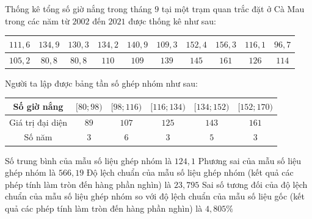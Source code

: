 \begin{ex}%

	Thống kê tổng số giờ nắng trong tháng $9$ tại một trạm quan trắc đặt ở Cà Mau trong các năm từ $2002$ đến $2021$ được thống kê như sau:
	\begin{center}
		\begin{tabular}{|c|c|c|c|c|c|c|c|c|c|}
			\hline $111{,}6$&$134{,}9$&$130{,}3$&$134{,}2$&$140{,}9$&$109{,}3$&$152{,}4$&$156{,}3$&$116{,}1$&$96{,}7$\\
			\hline $105{,}2$&$80{,}8$&$80{,}8$&$110$&$109$&$139$&$145$&$161$&$126$&$114$\\
			\hline
		\end{tabular}
	\end{center}
	Người ta lập được bảng tần số ghép nhóm như sau:
	\begin{center}
		\begin{tabular}{|c|c|c|c|c|c|}
			\hline Số giờ nắng&{$[80;98)$}&{$[98;116)$}&$[116;134)$&$[134;152)$&$[152;170)$\\
			\hline Giá trị đại diện&$89$&$107$&$125$&$143$&$161$\\
			\hline Số năm&$3$&$6$&$3$&$5$&$3$\\
			\hline
		\end{tabular}
	\end{center}
	\choiceTF
	{\True Số trung bình của mẫu số liệu ghép nhóm là $124{,}1$}
	{\True Phương sai của mẫu số liệu ghép nhóm là $566{,}19$}
	{\True Độ lệch chuẩn của mẫu số liệu ghép nhóm (kết quả các phép tính làm tròn đến hàng phần nghìn) là $23{,}795$}
	{\True Sai số tương đối của độ lệch chuẩn của mẫu số liệu ghép nhóm so với độ lệch chuẩn của mẫu số liệu gốc (kết quả các phép tính làm tròn đến hàng phần nghìn) là $4{,}805 \%$}
\end{ex}
